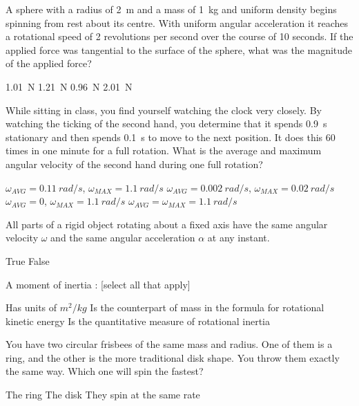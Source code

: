 \question A sphere with a radius of \SI{2}{m} and a mass of \SI{1}{kg} and uniform density begins spinning from rest about its centre.  With uniform angular acceleration it reaches a rotational speed of 2 revolutions per second over the course of 10 seconds.  If the applied force was tangential to the surface of the sphere, what was the magnitude of the applied force?
\begin{checkboxes}
\CorrectChoice \SI{1.01}{N} \correct
\choice \SI{1.21}{N}
\choice \SI{0.96}{N}
\choice \SI{2.01}{N}
\end{checkboxes}


\question While sitting in class, you find yourself watching the clock very closely. By watching the ticking of the second hand, you determine that it spends \SI{0.9}{s} stationary and then spends \SI{0.1}{s} to move to the next position. It does this 60 times in one minute for a full rotation. What is the average and maximum angular velocity of the second hand during one full rotation?
\begin{checkboxes}
\CorrectChoice $\omega_{AVG} = \SI{0.11}{rad\per s}$, $\omega_{MAX} = \SI{1.1}{rad\per s}$ \correct
\choice $\omega_{AVG} = \SI{0.002}{rad\per s}$, $\omega_{MAX} = \SI{0.02}{rad\per s}$
\choice $\omega_{AVG} = 0$, $\omega_{MAX} = \SI{1.1}{rad\per s}$
\choice $\omega_{AVG} = \omega_{MAX} = \SI{1.1}{rad\per s}$
\end{checkboxes}

\question All parts of a rigid object rotating about a fixed axis have the same angular velocity $\omega$ and the same angular acceleration $\alpha$ at any instant.
\begin{checkboxes}
\CorrectChoice True \correct
\choice False
\end{checkboxes}

\question A moment of inertia : [select all that apply]
\begin{checkboxes}
\choice Has units of $m^2/kg$
\CorrectChoice Is the counterpart of mass in the formula for rotational kinetic energy \correct
\CorrectChoice Is the quantitative measure of rotational inertia \correct
\end{checkboxes}

\question You have two circular frisbees of the same mass and radius. One of them is a ring, and the other is the more traditional disk shape. You throw them exactly the same way. Which one will spin the fastest?
\begin{checkboxes}
\choice The ring
\CorrectChoice The disk \correct
\choice They spin at the same rate
\end{checkboxes}

